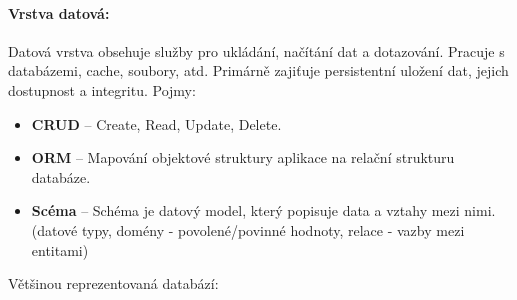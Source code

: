 \paragraph*{Vrstva datová:}
Datová vrstva obsehuje služby pro ukládání, načítání dat a dotazování.
Pracuje s databázemi, cache, soubory, atd. Primárně zajiťuje persistentní 
uložení dat, jejich dostupnost a integritu.
Pojmy:
\begin{itemize}
    \item \textbf{CRUD} -- Create, Read, Update, Delete.
    \item \textbf{ORM} -- Mapování objektové struktury aplikace na relační strukturu databáze.
    \item \textbf{Scéma} -- Schéma je datový model, který popisuje data a vztahy mezi nimi. (datové typy, domény - povolené/povinné hodnoty, relace - vazby mezi entitami)
\end{itemize}
Většinou reprezentovaná databází:
